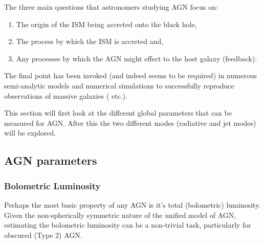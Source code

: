 	The three main questions that astronomers studying AGN focus on:
	\begin{enumerate}
		\item The origin of the ISM being accreted onto the black hole,
		\item The process by which the ISM is accreted and,
		\item Any processes by which the AGN might effect to the host galaxy (feedback).
	\end{enumerate}
	The final point has been invoked (and indeed seems to be required) in numerous semi-analytic models and numerical simulations to successfully reproduce observations of massive galaxies (\citet{DiMatteo2005, Bower2006, Springel2005} etc.). 

	This section will first look at the different global parameters that can be measured for AGN. After this the two different modes (radiative and jet modes) will be explored.

	\subsection{AGN parameters}
		\label{subsec:AGNparams}

		\subsubsection{Bolometric Luminosity}
			Perhaps the most basic property of any AGN is it's total (bolometric) luminosity. Given the non-spherically symmetric nature of the unified model of AGN, estimating the bolometric luminosity can be a non-trivial task, particularly for obscured (Type 2) AGN. 

